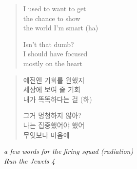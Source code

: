 \clearpage\thispagestyle{empty}\vspace*{\fill}

\begin{verse}
I used to want to get \\
the chance to show \\
the world I'm smart (ha)

Isn't that dumb? \\
I should have focused \\
mostly on the heart
\end{verse}
\begin{verse}\small
예전엔 기회를 원했지 \\
세상에 보여 줄 기회 \\
내가 똑똑하다는 걸 (하)

그거 멍청하지 않아? \\
나는 집중했어야 했어 \\
무엇보다 마음에
\end{verse}
\begin{flushright}\small\itshape
a few words for the firing squad (radiation) \\
Run the Jewels 4
\end{flushright}

\vspace*{\fill}\clearpage
